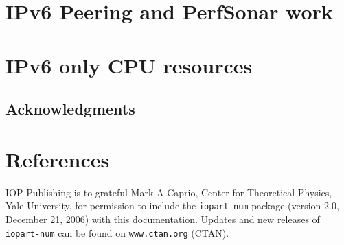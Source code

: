 \documentclass[a4paper]{jpconf}
\begin{document}
\section{IPv6 Peering and PerfSonar work}

\section{IPv6 only CPU resources}


\subsection{Acknowledgments}



\section*{References}
\begin{thebibliography}{9}
 IOP Publishing is to grateful Mark A Caprio, Center for Theoretical Physics, Yale University, for permission to include the {\tt iopart-num} \BibTeX package (version 2.0, December 21, 2006) with  this documentation. Updates and new releases of {\tt iopart-num} can be found on \verb"www.ctan.org" (CTAN). 
\end{thebibliography}
\end{document}
